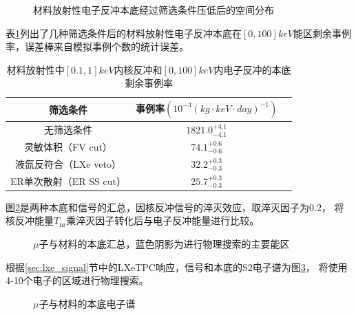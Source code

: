 \begin{figure}
  \centering
  
  \caption{\label{fig:material_er_xyzr} 材料放射性电子反冲本底经过筛选条件压低后的空间分布}
\end{figure}

表\ref{tab:cuts_material_remain}列出了几种筛选条件后的材料放射性电子反冲本底在$[0,100]\si{keV}$能区剩余事例率，误差棒来自模拟事例个数的统计误差。

\begin{table}
  \centering
  \caption{材料放射性中$[0.1,1]\si{keV}$内核反冲和$[0,100]\si{keV}$内电子反冲的本底剩余事例率}
  \begin{tabular}{ccc}
    \toprule
    筛选条件 & 事例率$\left(10^{-3}\left(\si{kg}\cdot\si{keV}\cdot\si{day}\right)^{-1}\right)$ \\
    \midrule
    无筛选条件 & $1821.0_{-4.1}^{+4.1}$ \\
    灵敏体积（FV cut） & $74.1_{-0.6}^{+0.6}$ \\
    液氙反符合（LXe veto） & $32.2_{-0.3}^{+0.3}$ \\
    ER单次散射（ER SS cut） & $25.7_{-0.3}^{+0.3}$ \\
    \bottomrule
  \end{tabular}
  \label{tab:cuts_material_remain}
\end{table}

图\ref{fig:all_event_rate}是两种本底和信号的汇总，因核反冲信号的淬灭效应，取淬灭因子为0.2，
将核反冲能量$T_\mathrm{nr}$乘淬灭因子转化后与电子反冲能量进行比较。

\begin{figure}
  \centering
  
  \caption{\label{fig:all_event_rate} $\mu$子与材料的本底汇总，蓝色阴影为进行物理搜索的主要能区}
\end{figure}

根据\ref{sec:lxe_signal}节中的LXeTPC响应，信号和本底的$\mathrm{S2}$电子谱为图\ref{fig:S2e_rate_bkg}，
将使用4-10个电子的区域进行物理搜索。

\begin{figure}
  \centering
  
  \caption{\label{fig:S2e_rate_bkg} $\mu$子与材料的本底电子谱}
\end{figure}
